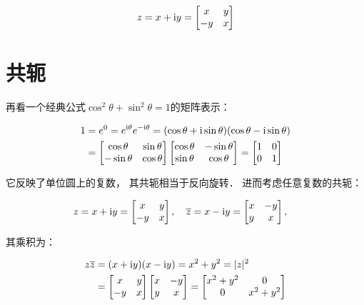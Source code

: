 \documentclass[10pt, openany]{book}
\begin{document}
$$
z = x + \text iy =
\begin{bmatrix}
x & y \\ -y & x
\end{bmatrix}
$$

\section{共轭}

再看一个经典公式$\cos^2\theta + \sin^2\theta = 1$的矩阵表示：

$$
\begin{aligned}
1 &= e^0 = e^{\text i\theta}e^{-\text i\theta} 
= (\cos \theta + \text i\sin \theta)(\cos \theta - \text i\sin \theta) \\
&=\begin{bmatrix}
\cos \theta & \sin \theta \\
-\sin \theta & \cos \theta \\
\end{bmatrix}
\begin{bmatrix}
\cos \theta & -\sin \theta \\
\sin \theta & \cos \theta \\
\end{bmatrix}
=\begin{bmatrix}
1 & 0 \\
0 & 1 \\
\end{bmatrix}
\end{aligned}
$$

它反映了单位圆上的复数，
其共轭相当于反向旋转．
进而考虑任意复数的共轭：

$$
z = x + \text iy =
\begin{bmatrix}
x & y \\ -y & x
\end{bmatrix}, \quad 
\overline z = x - \text iy =
\begin{bmatrix}
x & -y \\ y & x
\end{bmatrix}, \quad 
$$

其乘积为：

$$
\begin{aligned}
z \overline z
&= (x + \text iy)(x - \text iy)
= x^2 + y^2 = |z|^2 \\
&=\begin{bmatrix}
x & y \\ -y & x
\end{bmatrix}
\begin{bmatrix}
x & -y \\ y & x
\end{bmatrix}
=\begin{bmatrix}
x^2 + y^2 & 0 \\ 0 & x^2 + y^2
\end{bmatrix}
\end{aligned}
$$
\end{document}
